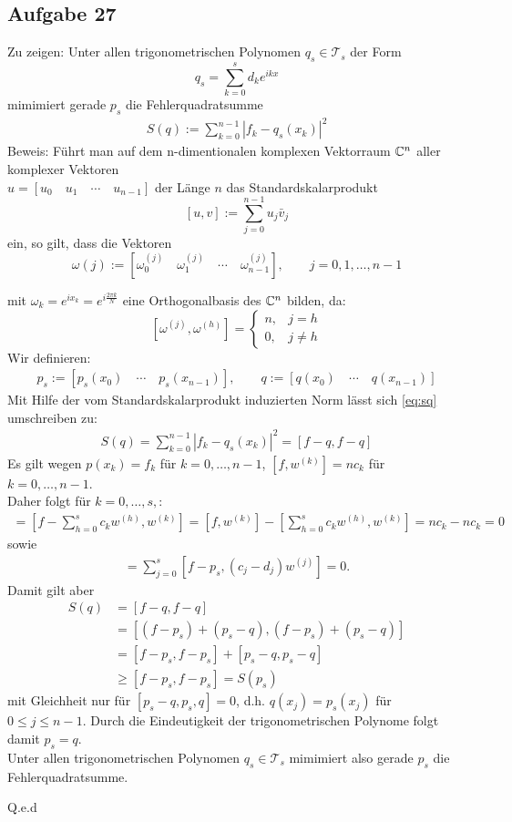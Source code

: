 \subsection*{Aufgabe 27}
Zu zeigen: Unter allen trigonometrischen Polynomen $q_s \in \mathcal{T}_s$ der Form
\[
	q_s= \sum_{k=0}^{s}d_ke^{ikx}
\]
mimimiert gerade $p_s$ die Fehlerquadratsumme
\begin{align} \label{eq:sq}
	S(q):=\sum_{k=0}^{n-1}|f_k - q_s(x_k)|^2
\end{align} \newline
Beweis: Führt man auf dem n-dimentionalen komplexen Vektorraum $\mathbb C^n$ aller komplexer Vektoren\\
 $u=[u_0 \quad u_1 \quad \cdots \quad u_{n-1}]$ der Länge $n$ das Standardskalarprodukt
\[
	[u,v] := \sum_{j=0}^{n-1}u_j\bar{v}_j
\]
ein, so gilt, dass die Vektoren
\[
	\omega {(j)}:=[\omega_0^{(j)} \quad \omega_1^{(j)} \quad \cdots \quad \omega_{n-1}^{(j)}], \qquad j=0,1,\dots,n-1
\]

mit $\omega_k = e^{ix_k}=e^{i\frac{2\pi k}{N}}$
eine Orthogonalbasis des $\mathbb C^n$ bilden, da:
\[
	[\omega^{(j)},\omega^{(h)}] = \left\{\begin{array}{ll} n, & j = h \\
	0, & j\neq h\end{array}\right.
\]
Wir definieren:
\begin{align*}
	p_s := [p_s(x_0)\quad \cdots \quad p_s(x_{n-1})], \qquad q:=[q(x_0) \quad \cdots \quad q(x_{n-1})]
\end{align*}
Mit Hilfe der vom Standardskalarprodukt induzierten Norm lässt sich \eqref{eq:sq} umschreiben zu:
\begin{align*}
S(q)=\sum_{k=0}^{n-1}|f_k - q_s(x_k)|^2 = [f-q,f-q]
\end{align*}
Es gilt wegen $p(x_k)=f_k$ für $k=0, \dots ,n-1$, $[f,w^{(k)}]=nc_k$ für $k=0, \dots ,n-1$. \\Daher folgt für $k=0, \dots ,s,$:
\begin{align*}
	[f-p_s,w^{(k)}] = [f-\sum_{h=0}^{s}c_kw^{(h)}, w^{(k)}]=[f, w^{(k)}]-[\sum_{h=0}^{s}c_kw^{(h)}, w^{(k)}]=nc_k-nc_k=0
\end{align*}
sowie
\begin{align*}
	[f-p_s,p_s-q] = \sum_{j=0}^{s}[f-p_s,(c_j-d_j)w^{(j)}]=0.
\end{align*}
Damit gilt aber
\begin{align*}
	S(q) &= [f-q,f-q]\\
	&= [(f-p_s)+(p_s-q),(f-p_s)+(p_s-q)]\\
	&= [f-p_s,f-p_s]+[p_s-q,p_s-q]\\
	&\geq [f-p_s,f-p_s] = S(p_s)
\end{align*}
mit Gleichheit nur für $[p_s-q,p_s,q]=0$, d.h. $q(x_j)=p_s(x_j)$ für $0 \leq j \leq n-1$. Durch die Eindeutigkeit der trigonometrischen Polynome folgt damit $p_s=q$.\\
\newline
Unter allen trigonometrischen Polynomen $q_s \in \mathcal{T}_s$ mimimiert also gerade $p_s$ die Fehlerquadratsumme.
\begin{flushright}
Q.e.d
\end{flushright}